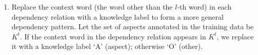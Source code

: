 \documentclass[11pt,a4paper]{article}
\theoremstyle{definition}
\begin{document}
\begin{enumerate}
    
    
    
    \item Replace the context word (the word other than the $l$-th word) in each dependency relation with a knowledge label to form a more general dependency pattern. Let the set of aspects annotated in the training data be $K^t$. If the context word in the dependency relation appears in $K^t$, we replace it with a knowledge label `A' (aspect); otherwise `O' (other). 
    
    
        


\end{enumerate}
\end{document}
